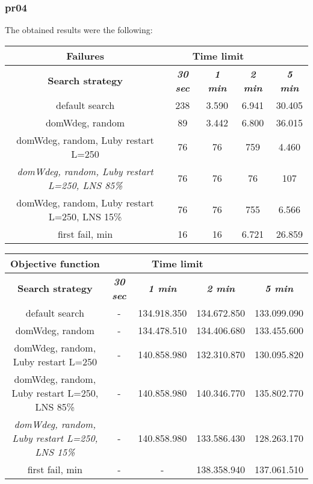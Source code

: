 \subsubsection{pr04}
The obtained results were the following:
{
\renewcommand{\arraystretch}{2}
\begin{longtable}[h]{| c | c | c | c | c |}
    \hline
    \textbf{Failures} & \multicolumn{3}{c}{Time limit} & \\
    \hline
    \textbf{Search strategy} & \textbf{\textit{30 sec}} & \textbf{\textit{1 min}} & \textbf{\textit{2 min}} & \textbf{\textit{5 min}} \\
    \hline
    \endhead
    default search                                         & 238 &  3.590 &  6.941 &  30.405 \\
    \hline
    domWdeg, random                                        &  89 &  3.442 &  6.800 &  36.015 \\
    \hline
    domWdeg, random, Luby restart L=250                    &  76 &    76 &   759 &   4.460 \\
    \hline
    \textit{domWdeg, random, Luby restart L=250, LNS 85\%} &  76 &    76 &    76 &    107 \\
    \hline
    domWdeg, random, Luby restart L=250, LNS 15\%          &  76 &    76 &   755 &   6.566 \\
    \hline
    first fail, min                                        &  16 &    16 &  6.721 &  26.859 \\
    \hline
\end{longtable}
}

{
\renewcommand{\arraystretch}{2}
\begin{longtable}[h]{| c | c | c | c | c |}
    \hline
    \textbf{Objective function} & \multicolumn{3}{c}{Time limit} & \\
    \hline
    \textbf{Search strategy} & \textbf{\textit{30 sec}} & \textbf{\textit{1 min}} & \textbf{\textit{2 min}} & \textbf{\textit{5 min}} \\
    \hline
    \endhead
    default search                                         &         - & 134.918.350 & 134.672.850 & 133.099.090 \\
    \hline
    domWdeg, random                                        &         - & 134.478.510 & 134.406.680 & 133.455.600 \\
    \hline
    domWdeg, random, Luby restart L=250                    &         - & 140.858.980 & 132.310.870 & 130.095.820 \\
    \hline
    domWdeg, random, Luby restart L=250, LNS 85\%          &         - & 140.858.980 & 140.346.770 & 135.802.770 \\
    \hline
    \textit{domWdeg, random, Luby restart L=250, LNS 15\%} &         - & 140.858.980 & 133.586.430 & 128.263.170 \\
    \hline
    first fail, min                                        &        - &         - & 138.358.940 & 137.061.510 \\
    \hline
\end{longtable}
}
